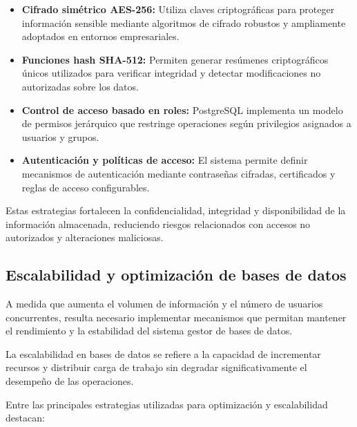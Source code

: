 \documentclass[12pt, oneside, letterpaper]{book}
\begin{document}
\begin{itemize}

\item \textbf{Cifrado simétrico AES-256:} Utiliza claves criptográficas para proteger información sensible mediante algoritmos de cifrado robustos y ampliamente adoptados en entornos empresariales.

\item \textbf{Funciones hash SHA-512:} Permiten generar resúmenes criptográficos únicos utilizados para verificar integridad y detectar modificaciones no autorizadas sobre los datos.

\item \textbf{Control de acceso basado en roles:} PostgreSQL implementa un modelo de permisos jerárquico que restringe operaciones según privilegios asignados a usuarios y grupos.

\item \textbf{Autenticación y políticas de acceso:} El sistema permite definir mecanismos de autenticación mediante contraseñas cifradas, certificados y reglas de acceso configurables.
\end{itemize}

Estas estrategias fortalecen la confidencialidad, integridad y disponibilidad de la información almacenada, reduciendo riesgos relacionados con accesos no autorizados y alteraciones maliciosas.

\subsection{Escalabilidad y optimización de bases de datos}

A medida que aumenta el volumen de información y el número de usuarios concurrentes, resulta necesario implementar mecanismos que permitan mantener el rendimiento y la estabilidad del sistema gestor de bases de datos.

La escalabilidad en bases de datos se refiere a la capacidad de incrementar recursos y distribuir carga de trabajo sin degradar significativamente el desempeño de las operaciones.

Entre las principales estrategias utilizadas para optimización y escalabilidad destacan:
\end{document}
